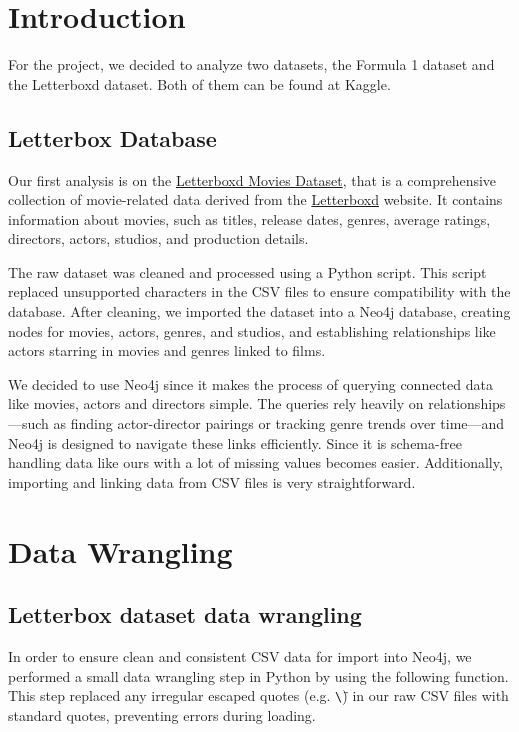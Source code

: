 \documentclass{Configuration_Files/PoliMi3i_thesis}
\begin{document}
\mainmatter %

\chapter{Introduction}

For the project, we decided to analyze two datasets, the Formula 1 dataset and the Letterboxd dataset. Both of them can be found at Kaggle.

\section{Letterbox Database}

Our first analysis is on the \href{https://www.kaggle.com/datasets/gsimonx37/letterboxd}{Letterboxd Movies Dataset}, that is a comprehensive collection of movie-related data derived from the \href{https://letterboxd.com/}{Letterboxd} website. It contains information about movies, such as titles, release dates, genres, average ratings, directors, actors, studios, and production details.

The raw dataset was cleaned and processed using a Python script. This script replaced unsupported characters in the CSV files to ensure compatibility with the database. After cleaning, we imported the dataset into a Neo4j database, creating nodes for movies, actors, genres, and studios, and establishing relationships like actors starring in movies and genres linked to films.

We decided to use Neo4j since it makes the process of querying connected data like movies, actors and directors simple. The queries rely heavily on relationships—such as finding actor-director pairings or tracking genre trends over time—and Neo4j is designed to navigate these links efficiently. Since it is schema-free handling data like ours with a lot of missing values becomes easier. Additionally, importing and linking data from CSV files is very straightforward.

\chapter{Data Wrangling}
\section{Letterbox dataset data wrangling}
In order to ensure clean and consistent CSV data for import into Neo4j, we performed 
a small data wrangling step in Python by using the following function. This step replaced any irregular escaped quotes 
(e.g. \texttt{\textbackslash \"}) in our raw CSV files with standard quotes, preventing 
errors during loading.
\end{document}
